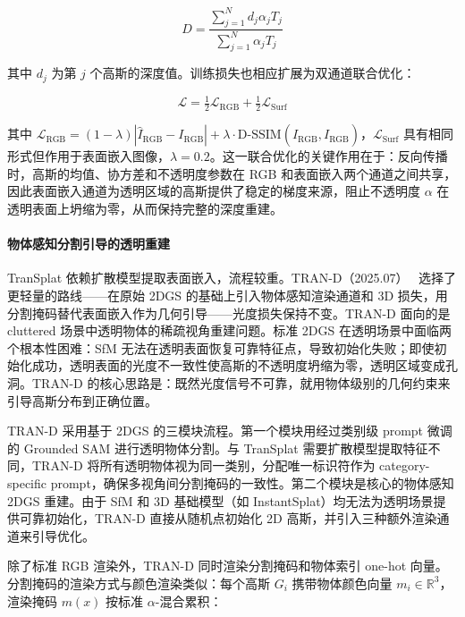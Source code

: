\begin{equation}
D = \frac{\sum_{j=1}^{N} d_j \alpha_j T_j}{\sum_{j=1}^{N} \alpha_j T_j}
\end{equation}

其中 $d_j$ 为第 $j$ 个高斯的深度值。训练损失也相应扩展为双通道联合优化：

\begin{equation}
\mathcal{L} = \tfrac{1}{2}\mathcal{L}_{\text{RGB}} + \tfrac{1}{2}\mathcal{L}_{\text{Surf}}
\end{equation}

其中 $\mathcal{L}_{\text{RGB}} = (1-\lambda)|\hat{I}_{\text{RGB}} - I_{\text{RGB}}| + \lambda \cdot \text{D-SSIM}(\hat{I}_{\text{RGB}}, I_{\text{RGB}})$，$\mathcal{L}_{\text{Surf}}$ 具有相同形式但作用于表面嵌入图像，$\lambda = 0.2$。这一联合优化的关键作用在于：反向传播时，高斯的均值、协方差和不透明度参数在 RGB 和表面嵌入两个通道之间共享，因此表面嵌入通道为透明区域的高斯提供了稳定的梯度来源，阻止不透明度 $\alpha$ 在透明表面上坍缩为零，从而保持完整的深度重建。

\paragraph{物体感知分割引导的透明重建}

TranSplat 依赖扩散模型提取表面嵌入，流程较重。TRAN-D（2025.07）~\cite{2507_11069} 选择了更轻量的路线——在原始 2DGS 的基础上引入物体感知渲染通道和 3D 损失，用分割掩码替代表面嵌入作为几何引导——光度损失保持不变。TRAN-D 面向的是 cluttered 场景中透明物体的稀疏视角重建问题。标准 2DGS 在透明场景中面临两个根本性困难：SfM 无法在透明表面恢复可靠特征点，导致初始化失败；即使初始化成功，透明表面的光度不一致性使高斯的不透明度坍缩为零，透明区域变成孔洞。TRAN-D 的核心思路是：既然光度信号不可靠，就用物体级别的几何约束来引导高斯分布到正确位置。

TRAN-D 采用基于 2DGS 的三模块流程。第一个模块用经过类别级 prompt 微调的 Grounded SAM 进行透明物体分割。与 TranSplat 需要扩散模型提取特征不同，TRAN-D 将所有透明物体视为同一类别，分配唯一标识符作为 category-specific prompt，确保多视角间分割掩码的一致性。第二个模块是核心的物体感知 2DGS 重建。由于 SfM 和 3D 基础模型（如 InstantSplat）均无法为透明场景提供可靠初始化，TRAN-D 直接从随机点初始化 2D 高斯，并引入三种额外渲染通道来引导优化。

除了标准 RGB 渲染外，TRAN-D 同时渲染分割掩码和物体索引 one-hot 向量。分割掩码的渲染方式与颜色渲染类似：每个高斯 $G_i$ 携带物体颜色向量 $m_i \in \mathbb{R}^3$，渲染掩码 $m(x)$ 按标准 $\alpha$-混合累积：

